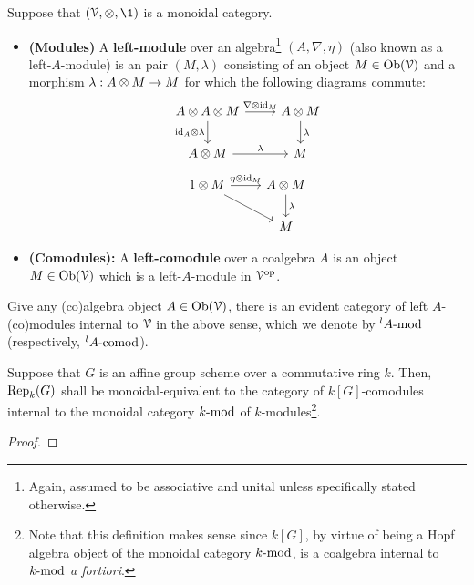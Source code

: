             \begin{definition} \label{def: modules_and_comodules}
                Suppose that $(\calV, \tensor, \1)$ is a monoidal category. 
                    \begin{itemize}
                        \item \textbf{(Modules)} A \textbf{left-module} over an algebra\footnote{Again, assumed to be associative and unital unless specifically stated otherwise.} $(A, \nabla, \eta)$ (also known as a left-$A$-module) is an pair $(M, \lambda)$ consisting of an object $M \in \Ob(\calV)$ and a morphism $\lambda: A \tensor M \to M$ for which the following diagrams commute:
                            $$
                                \begin{tikzcd}
                                	{A \tensor A \tensor M} & {A \tensor M} \\
                                	{A \tensor M} & M
                                	\arrow["{\id_A \tensor \lambda}"', from=1-1, to=2-1]
                                	\arrow["\lambda", from=2-1, to=2-2]
                                	\arrow["{\nabla \tensor \id_M}", from=1-1, to=1-2]
                                	\arrow["\lambda", from=1-2, to=2-2]
                                \end{tikzcd}
                            $$
                            $$
                                \begin{tikzcd}
                                	{1 \tensor M} & {A \tensor M} \\
                                	& M
                                	\arrow["{\eta \tensor \id_M}", from=1-1, to=1-2]
                                	\arrow["\lambda", from=1-2, to=2-2]
                                	\arrow[from=1-1, to=2-2]
                                \end{tikzcd}
                            $$
                        \item \textbf{(Comodules):} A \textbf{left-comodule} over a coalgebra $A$ is an object $M \in \Ob(\calV)$ which is a left-$A$-module in $\calV^{\op}$. 
                    \end{itemize}
                Give any (co)algebra object $A \in \Ob(\calV)$, there is an evident category of left $A$-(co)modules internal to $\calV$ in the above sense, which we denote by ${}^lA\mod$ (respectively, ${}^lA\comod$).
            \end{definition}
            \begin{proposition}
                Suppose that $G$ is an affine group scheme over a commutative ring $k$. Then, $\Rep_k(G)$ shall be monoidal-equivalent to the category of $k[G]$-comodules internal to the monoidal category $k\mod$ of $k$-modules\footnote{Note that this definition makes sense since $k[G]$, by virtue of being a Hopf algebra object of the monoidal category $k\mod$, is a coalgebra internal to $k\mod$ \textit{a fortiori}.}.
            \end{proposition}
                \begin{proof}
                    
                \end{proof}
            
